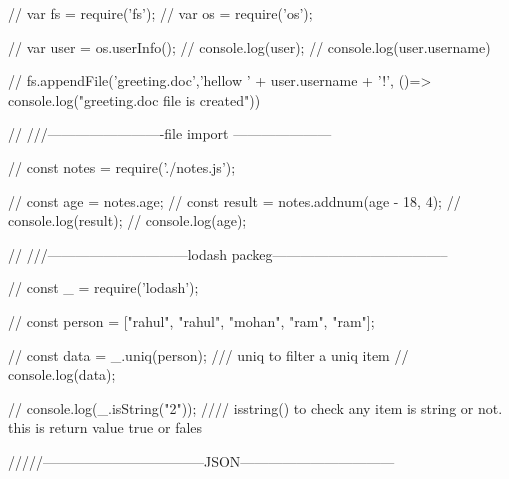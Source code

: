 // var fs = require('fs');
// var os = require('os'); 

// var user = os.userInfo();
// console.log(user);
// console.log(user.username)

// fs.appendFile('greeting.doc','hellow ' + user.username + '!\n', ()=> console.log("greeting.doc file is created")) 

// ///-------------------------file import ---------------------

// const notes = require('./notes.js');

// const age = notes.age;
// const result = notes.addnum(age - 18, 4);
// console.log(result);
// console.log(age);

// ///------------------------------lodash packeg--------------------------------------

// const _ = require('lodash');

// const person = ["rahul", "rahul", "mohan", "ram", "ram"];

// const data = _.uniq(person); /// uniq to filter a uniq item
// console.log(data);

// console.log(_.isString("2")); //// isstring() to check any item is string or not. this is return value true or fales 

/////-----------------------------------JSON---------------------------------